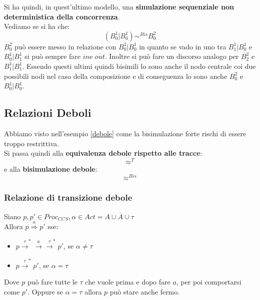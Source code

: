 \begin{esempio}
\begin{center}
  \end{center}
  Si ha quindi, in quest'ultimo modello, una \textbf{simulazione sequenziale non
    deterministica della concorrenza}.\\
  Vediamo se si ha che:
  \[(B_0^1|B_0^1)\sim^{Bis}B_0^2\]
  $B_0^2$ può essere messo in relazione con $B_0^1|B_0^1$ in quanto se vado in
  uno tra $B_1^1|B_0^1$ e $B_0^1|B_1^1$ si può sempre fare $in $e
  $\overline{out}$. Inoltre si può fare un discorso analogo per $B_2^2$ e
  $B_1^1|B_1^1$. Essendo questi ultimi quindi bisimili lo sono anche il nodo
  centrale coi due possibili nodi nel caso della composizione e di conseguenza
  lo sono anche $B_0^2$ e $B_0^1|B_0^1$.
\end{esempio}
\subsection{Relazioni Deboli}
Abbiamo visto nell'esempio \ref{debole} come la bisimulazione forte rischi di
essere troppo restrittiva.\\
Si passa quindi alla \textbf{equivalenza debole rispetto alle tracce}:
\[\approx^{T}\]
e alla \textbf{bisimulazione debole}:
\[\approx^{Bis}\]
\subsubsection{Relazione di transizione debole}
\begin{definizione}
  Siano $p,p' \in Proc_{CCS}, \alpha \in Act=A\cup \overline{A}\cup \tau$\\
  Allora $p\stackrel{a}{\Rightarrow}p'$ sse:
  \begin{itemize}
      \item $p\stackrel{\tau}{\rightarrow}^*
      \stackrel{a}{\rightarrow}\stackrel{\tau}{\rightarrow}^*p'$, se $\alpha \neq \tau$
      \item   $p\stackrel{\tau}{\rightarrow}^*p'$, se $\alpha = \tau$
  \end{itemize}
\end{definizione}
Dove $p$ può fare tutte le $\tau$ che vuole prima e dopo fare $a$, per poi comportarsi come $p'$. Oppure se $\alpha = \tau$ allora $p$ può stare anche fermo.
